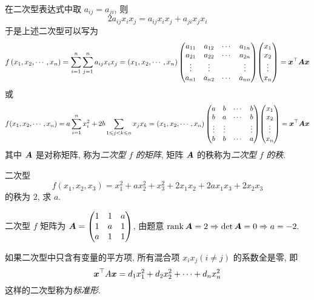 \begin{definition}[二次型的矩阵表达]
    在二次型表达式中取 $ a_{i j}=a_{j i} $, 则
    $$2 a_{i j} x_{i} x_{j}=a_{i j} x_{i} x_{j}+a_{j i} x_{j} x_{i}$$
    于是上述二次型可以写为
    $$f\left(x_{1}, x_{2}, \cdots, x_{n}\right)=\sum_{i=1}^{n} \sum_{j=1}^{n} a_{i j} x_{i} x_{j}=
        \left(x_{1}, x_{2}, \cdots, x_{n}\right)
        \mqty(a_{11} & a_{12} & \cdots & a_{1 n} \\
        a_{21} & a_{22} & \cdots & a_{2 n} \\
        \vdots & \vdots & & \vdots \\
        a_{n 1} & a_{n 2} & \cdots & a_{n n})
        \mqty(x_{1} \\    x_{2} \\    \vdots \\    x_{n})
        =\vb*{x}^\top \vb*{A} \vb*{x} $$
    或
    $$f(x_1,x_2,\cdots,x_n)=a\sum_{i=1}^{n}x_i^2+2b\sum_{1\leqslant j<k\leqslant n}x_jx_k=
        \left(x_{1}, x_{2}, \cdots, x_{n}\right)
        \mqty(a & b & \cdots & b \\
        b & a & \cdots & b \\
        \vdots & \vdots & & \vdots \\
        b & b & \cdots & a)
        \mqty(x_{1} \\    x_{2} \\    \vdots \\    x_{n})
        =\vb*{x}^\top \vb*{A} \vb*{x}$$
    其中 $ \vb*{A} $ 是对称矩阵, 称为\textit{二次型} $ f $ \textit{的矩阵},
    矩阵 $ \vb*{A} $ 的秩称为\textit{二次型} $ f $ \textit{的秩}.
\end{definition}

\begin{example}
    二次型 $$f(x_1,x_2,x_3)=x_1^2+ax_2^2+x_3^2+2x_1x_2+2ax_1x_3+2x_2x_3$$ 的秩为 $2$, 求 $a.$
\end{example}
\begin{solution}
    二次型 $f$ 矩阵为 $\vb*{A}=\mqty(1&1&a\\1&a&1\\a&1&1)$, 由题意 $\rank\vb*{A}=2\Rightarrow \det\vb*{A}=0\Rightarrow a=-2.$
\end{solution}

\begin{definition}[二次型的标准形]
    如果二次型中只含有变量的平方项, 所有混合项 $ x_{i} x_{j}(i \neq j) $ 的系数全是零, 即
    $$\vb*{x}^{\top} A \vb*{x}=d_{1} x_{1}^{2}+d_{2} x_{2}^{2}+\cdots+d_{n} x_{n}^{2}$$
    这样的二次型称为\textit{标准形}.
\end{definition}

